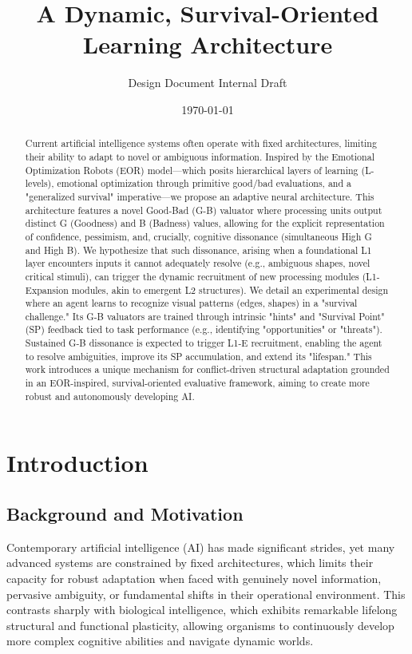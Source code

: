 \documentclass{article}
\author{Design Document Internal Draft}
\date{\today}
\title{A Dynamic, Survival-Oriented Learning Architecture}
\begin{document}
\maketitle

\begin{abstract}
Current artificial intelligence systems often operate with fixed architectures, limiting their ability to adapt to novel or ambiguous information. Inspired by the Emotional Optimization Robots (EOR) model—which posits hierarchical layers of learning (L-levels), emotional optimization through primitive good/bad evaluations, and a "generalized survival" imperative—we propose an adaptive neural architecture. This architecture features a novel Good-Bad (G-B) valuator where processing units output distinct G (Goodness) and B (Badness) values, allowing for the explicit representation of confidence, pessimism, and, crucially, cognitive dissonance (simultaneous High G and High B). We hypothesize that such dissonance, arising when a foundational L1 layer encounters inputs it cannot adequately resolve (e.g., ambiguous shapes, novel critical stimuli), can trigger the dynamic recruitment of new processing modules (L1-Expansion modules, akin to emergent L2 structures). We detail an experimental design where an agent learns to recognize visual patterns (edges, shapes) in a "survival challenge." Its G-B valuators are trained through intrinsic "hints" and "Survival Point" (SP) feedback tied to task performance (e.g., identifying "opportunities" or "threats"). Sustained G-B dissonance is expected to trigger L1-E recruitment, enabling the agent to resolve ambiguities, improve its SP accumulation, and extend its "lifespan." This work introduces a unique mechanism for conflict-driven structural adaptation grounded in an EOR-inspired, survival-oriented evaluative framework, aiming to create more robust and autonomously developing AI.
\end{abstract}

\tableofcontents
\newpage

\section{Introduction}

\subsection{Background and Motivation}
Contemporary artificial intelligence (AI) has made significant strides, yet many advanced systems are constrained by fixed architectures, which limits their capacity for robust adaptation when faced with genuinely novel information, pervasive ambiguity, or fundamental shifts in their operational environment. This contrasts sharply with biological intelligence, which exhibits remarkable lifelong structural and functional plasticity, allowing organisms to continuously develop more complex cognitive abilities and navigate dynamic worlds.
\end{document}
